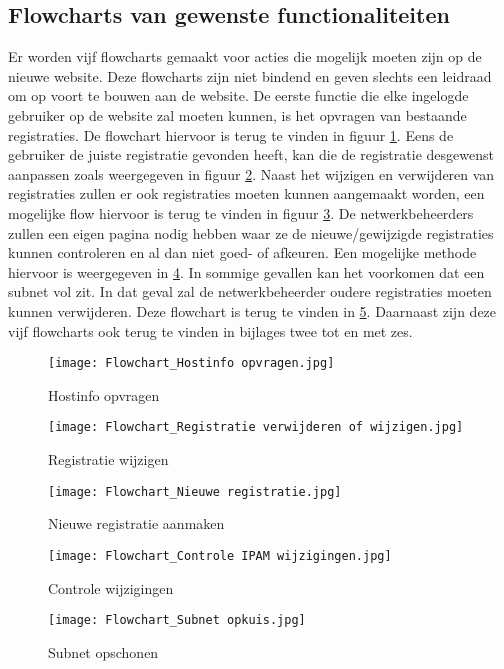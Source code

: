 \subsection{Flowcharts van gewenste functionaliteiten}
Er worden vijf flowcharts gemaakt voor acties die mogelijk moeten zijn op de nieuwe website. Deze flowcharts zijn niet bindend en geven slechts een leidraad om op voort te bouwen aan de website.
De eerste functie die elke ingelogde gebruiker op de website zal moeten kunnen, is het opvragen van bestaande registraties. De flowchart hiervoor is terug te vinden in figuur  \ref{fig:flowchart_hostinfo_opvragen}. Eens de gebruiker de juiste registratie gevonden heeft, kan die de registratie desgewenst aanpassen zoals weergegeven in figuur \ref{fig:flowchart_registratie_wijzigen}. Naast het wijzigen en verwijderen van registraties zullen er ook registraties moeten kunnen aangemaakt worden, een mogelijke flow hiervoor is terug te vinden in figuur \ref{fig:flowchart_nieuwe_registratie}.
De netwerkbeheerders zullen een eigen pagina nodig hebben waar ze de nieuwe/gewijzigde registraties kunnen controleren en al dan niet goed- of afkeuren. Een mogelijke methode hiervoor is weergegeven in \ref{fig:flowchart_controle_Wijzigingen}. In sommige gevallen kan het voorkomen dat een subnet vol zit. In dat geval zal de netwerkbeheerder oudere registraties moeten kunnen verwijderen. Deze flowchart is terug te vinden in \ref{fig:flowchart_subnet_opkuisen}. Daarnaast zijn deze vijf flowcharts ook terug te vinden in bijlages twee tot en met zes.

\begin{figure}[H]
	\texttt{[image: Flowchart\_Hostinfo opvragen.jpg]}
	\caption{Hostinfo opvragen}
	\label{fig:flowchart_hostinfo_opvragen}
\end{figure}
\begin{figure}[H]
    \texttt{[image: Flowchart\_Registratie verwijderen of wijzigen.jpg]}
    \caption{Registratie wijzigen}
    \label{fig:flowchart_registratie_wijzigen}
\end{figure}
\begin{figure}[H]
    \texttt{[image: Flowchart\_Nieuwe registratie.jpg]}
    \caption{Nieuwe registratie aanmaken}
    \label{fig:flowchart_nieuwe_registratie}
\end{figure}
\begin{figure}[H]
    \texttt{[image: Flowchart\_Controle IPAM wijzigingen.jpg]}
    \caption{Controle wijzigingen}
    \label{fig:flowchart_controle_Wijzigingen}
\end{figure}
\begin{figure}[H]
    \texttt{[image: Flowchart\_Subnet opkuis.jpg]}
    \caption{Subnet opschonen}
    \label{fig:flowchart_subnet_opkuisen}
\end{figure}

